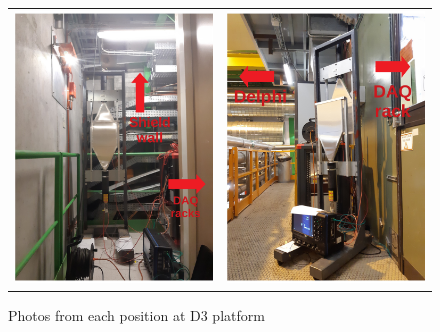\begin{figure}[h]
\begin{center}
\begin{tabular}[t]{cc}
      \includegraphics[width=8.5cm]{figs/INT/Othercorner.pdf} &
      \includegraphics[width=8.5cm]{figs/INT/D3_front.pdf} \\
    \end{tabular}
  \end{center}
\caption{
    Photos from each position at D3 platform
}
\end{figure}
